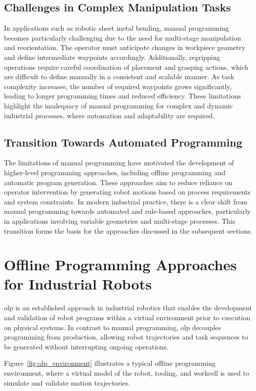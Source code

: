 \subsection{Challenges in Complex Manipulation Tasks}
In applications such as robotic sheet metal bending, manual programming becomes particularly challenging due to the need for multi-stage manipulation and reorientation. The operator must anticipate changes in workpiece geometry and define intermediate waypoints accordingly.
Additionally, regripping operations require careful coordination of placement and grasping actions, which are difficult to define manually in a consistent and scalable manner. As task complexity increases, the number of required waypoints grows significantly, leading to longer programming times and reduced efficiency.
These limitations highlight the inadequacy of manual programming for complex and dynamic industrial processes, where automation and adaptability are required.
\subsection{Transition Towards Automated Programming}
The limitations of manual programming have motivated the development of higher-level programming approaches, including offline programming and automatic program generation. These approaches aim to reduce reliance on operator intervention by generating robot motions based on process requirements and system constraints.
In modern industrial practice, there is a clear shift from manual programming towards automated and rule-based approaches, particularly in applications involving variable geometries and multi-stage processes. This transition forms the basis for the approaches discussed in the subsequent sections.
 
\section{Offline Programming Approaches for Industrial Robots}
\label{sec:offline-programming-approaches}
\ac{olp} is an established approach in industrial robotics that enables the development and validation of robot programs within a virtual environment prior to execution on physical systems. In contrast to manual programming, \ac{olp} decouples programming from production, allowing robot trajectories and task sequences to be generated without interrupting ongoing operations.
 
Figure~\ref{fig:olp_environment} illustrates a typical offline programming environment, where a virtual model of the robot, tooling, and workcell is used to simulate and validate motion trajectories.
 
